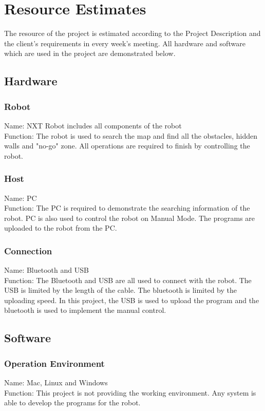 \documentclass[11pt, a4paper]{report}
\begin{document}
\pagebreak




\chapter{Resource Estimates} %
\label{cha:RE}
The resource of the project is estimated according to the Project Description and the client's requirements in every week's meeting. All hardware and software which are used in the project are demonstrated below.
\section{Hardware}
\subsection{Robot}
Name: NXT Robot includes all components of the robot\\
Function: The robot is used to search the map and find all the obstacles, hidden walls and "no-go" zone. All operations are required to finish by controlling the robot.
\subsection{Host}
Name: PC\\
Function: The PC is required to demonstrate the searching information of the robot. PC is also used to control the robot on Manual Mode. The programs are uploaded to the robot from the PC.
\subsection{Connection}
Name: Bluetooth and USB \\
Function: The Bluetooth and USB are all used to connect with the robot. The USB is limited by the length of the cable. The bluetooth is limited by the uploading speed. In this project, the USB is used to upload the program and the bluetooth is used to implement the manual control.
\section{Software}
\subsection{Operation Environment} 
Name: Mac, Linux and Windows\\
Function: This project is not providing the working environment. Any system is able to develop the programs for the robot.
\end{document}
